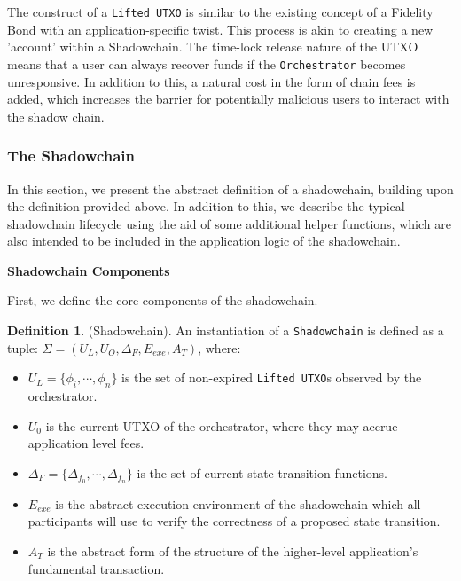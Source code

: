 \documentclass[10pt,a4paper]{article}
\theoremstyle{definition}
\newtheorem{definition}{Definition}[section]
\begin{document}

The construct of a \texttt{Lifted UTXO} is similar to the existing concept of a
Fidelity Bond \cite{fidelityBonds} with an application-specific twist. This
process is akin to creating a new 'account' within a Shadowchain. The time-lock
release nature of the UTXO means that a user can always recover funds if the
\texttt{Orchestrator} becomes unresponsive. In addition to this, a natural cost
in the form of chain fees is added, which increases the barrier for potentially
malicious users to interact with the shadow chain.

\subsubsection{The Shadowchain}

In this section, we present the abstract definition of a shadowchain, building
upon the definition provided above. In addition to this, we describe the
typical shadowchain lifecycle using the aid of some additional helper
functions, which are also intended to be included in the application logic of
the shadowchain.

\begin{center}
    \textbf{Shadowchain Components}
\end{center}

First, we define the core components of the shadowchain.

\begin{definition}{(Shadowchain).} An instantiation of a \texttt{Shadowchain}
    is defined as a tuple: $\Sigma = (U_{L}, U_{O}, \Delta_F, E_{exe},
    A_{T})$, where:
\end{definition}

\begin{itemize}
    \item $U_{L} = \{\phi_i, \cdots, \phi_n\}$ is the set of non-expired
        \texttt{Lifted UTXO}s observed by the orchestrator.

    \item $U_{0}$ is the current UTXO of the orchestrator, where they may
        accrue application level fees.

    \item $\Delta_F =  \{ \Delta_{f_0}, \cdots, \Delta_{f_n} \}$ is the set of
        current state transition functions.

    \item $E_{exe}$ is the abstract execution environment of the shadowchain
        which all participants will use to verify the correctness of a proposed
        state transition.

    \item $A_{T}$ is the abstract form of the structure of the higher-level
        application's fundamental transaction.

\end{itemize}
\end{document}
